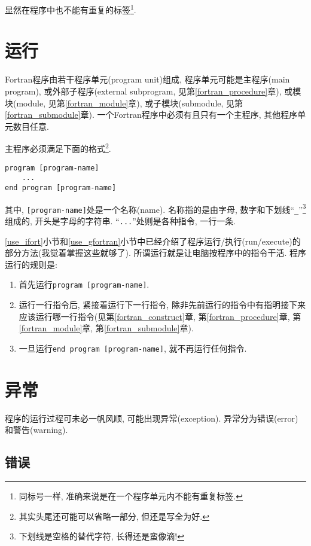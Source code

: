 显然在程序中也不能有重复的标签\footnote{
    同标号一样, 准确来说是在一个程序单元内不能有重复标签.
}.

\section{运行}\label{run_fortran}

Fortran程序由若干程序单元(program unit)组成, 程序单元可能是主程序(main program), 或外部子程序(external subprogram, 见第\ref{fortran_procedure}章), 或模块(module, 见第\ref{fortran_module}章), 或子模块(submodule, 见第\ref{fortran_submodule}章). 一个Fortran程序中必须有且只有一个主程序, 其他程序单元数目任意.

主程序必须满足下面的格式\footnote{
    其实头尾还可能可以省略一部分, 但还是写全为好.
}.
\begin{verbatim}
program [program-name]
    ...
end program [program-name]
\end{verbatim}
其中, \verb|[program-name]|处是一个名称(name). 名称指的是由字母, 数字和下划线``\verb|_|''\footnote{
    下划线是空格的替代字符, 长得还是蛮像滴!
}组成的, 开头是字母的字符串. ``\verb|...|''处则是各种指令, 一行一条.

\ref{use_ifort}小节和\ref{use_gfortran}小节中已经介绍了程序运行/执行(run/execute)的部分方法(我觉着掌握这些就够了). 所谓运行就是让电脑按程序中的指令干活. 程序运行的规则是:
\begin{enumerate}
    \item 首先运行\verb|program [program-name]|.
    \item 运行一行指令后, 紧接着运行下一行指令, 除非先前运行的指令中有指明接下来应该运行哪一行指令(见第\ref{fortran_construct}章, 第\ref{fortran_procedure}章, 第\ref{fortran_module}章, 第\ref{fortran_submodule}章).
    \item 一旦运行\verb|end program [program-name]|, 就不再运行任何指令.
\end{enumerate}

\section{异常}\label{fortran_exception}

程序的运行过程可未必一帆风顺, 可能出现异常(exception). 异常分为错误(error)和警告(warning).

\subsection{错误}\label{fortran_error}

